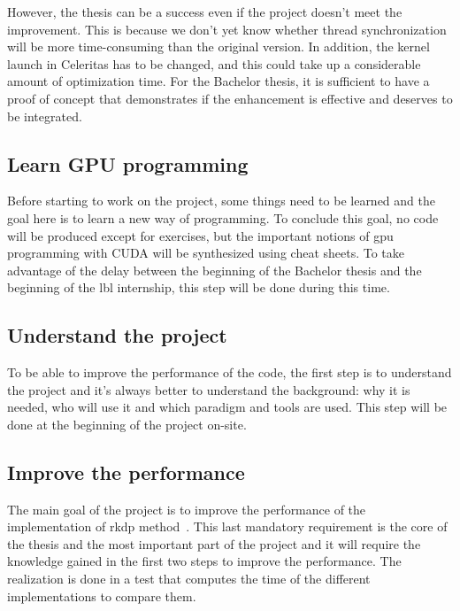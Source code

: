 However, the thesis can be a success even if the project doesn't meet the improvement.
This is because we don't yet know whether thread synchronization will be more
time-consuming than the original version.
In addition, the kernel launch in Celeritas has to be changed, and this
could take up a considerable amount of optimization time.
For the Bachelor thesis, it is sufficient to have a proof of concept that
demonstrates if the enhancement is effective and deserves to be integrated.

\subsection{Learn GPU programming}
\label{ch:introduction:objectives:learn-gpu-programming}

Before starting to work on the project, some things need to be learned and the goal here is to learn a new way of programming.
To conclude this goal, no code will be produced except for exercises, but the important notions of \acrshort{gpu} programming with CUDA will be synthesized using cheat sheets.
To take advantage of the delay between the beginning of the Bachelor thesis and the beginning of the \acrshort{lbl} internship, this step will be done during this time.


\subsection{Understand the project}
\label{ch:introduction:objectives:understand-the-project}

To be able to improve the performance of the code, the first step is to
understand the project and it's always better to understand the background:
why it is needed, who will use it and which paradigm and tools are used.
This step will be done at the beginning of the project on-site.


\subsection{Improve the performance}
\label{ch:introduction:objectives:improve-the-performance}

The main goal of the project is to improve the performance of the implementation of \acrfull{rkdp} method~\cite{princeDormand}.
This last mandatory requirement is the core of the thesis and the most important part of the project and it will require the knowledge gained in the first two steps to improve the performance.
The realization is done in a test that computes the time of the different
implementations to compare them.

